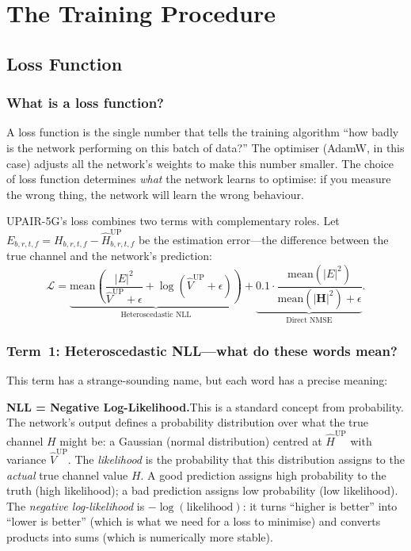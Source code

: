 \documentclass[11pt,a4paper]{article}
\newcommand{\bH}{\mathbf{H}}
\begin{document}
	\section{The Training Procedure}
	
	\subsection{Loss Function}
	
	\subsubsection*{What is a loss function?}
	
	A loss function is the single number that tells the training algorithm ``how badly is the network performing on this batch of data?''  The optimiser (AdamW, in this case) adjusts all the network's weights to make this number smaller.  The choice of loss function determines \emph{what} the network learns to optimise: if you measure the wrong thing, the network will learn the wrong behaviour.
	
	UPAIR-5G's loss combines two terms with complementary roles.  Let $E_{b,r,t,f} = H_{b,r,t,f} - \widehat{H}^{\mathrm{UP}}_{b,r,t,f}$ be the estimation error---the difference between the true channel and the network's prediction:
	\begin{equation}
		\mathcal{L} = \underbrace{\mathrm{mean}\!\left(\frac{|E|^2}{\widehat{V}^{\mathrm{UP}} + \epsilon} + \log(\widehat{V}^{\mathrm{UP}} + \epsilon)\right)}_{\text{Heteroscedastic NLL}} + \underbrace{0.1 \cdot \frac{\mathrm{mean}(|E|^2)}{\mathrm{mean}(|\bH|^2) + \epsilon}}_{\text{Direct NMSE}}.
		\label{eq:loss}
	\end{equation}
	
	\subsubsection*{Term~1: Heteroscedastic NLL---what do these words mean?}
	
	This term has a strange-sounding name, but each word has a precise meaning:
	
	\textbf{NLL = Negative Log-Likelihood.}\quad This is a standard concept from probability.  The network's output defines a probability distribution over what the true channel $H$ might be: a Gaussian (normal distribution) centred at $\widehat{H}^{\mathrm{UP}}$ with variance $\widehat{V}^{\mathrm{UP}}$.  The \emph{likelihood} is the probability that this distribution assigns to the \emph{actual} true channel value $H$.  A good prediction assigns high probability to the truth (high likelihood); a bad prediction assigns low probability (low likelihood).  The \emph{negative log-likelihood} is $-\log(\text{likelihood})$: it turns ``higher is better'' into ``lower is better'' (which is what we need for a loss to minimise) and converts products into sums (which is numerically more stable).
	
\end{document}
